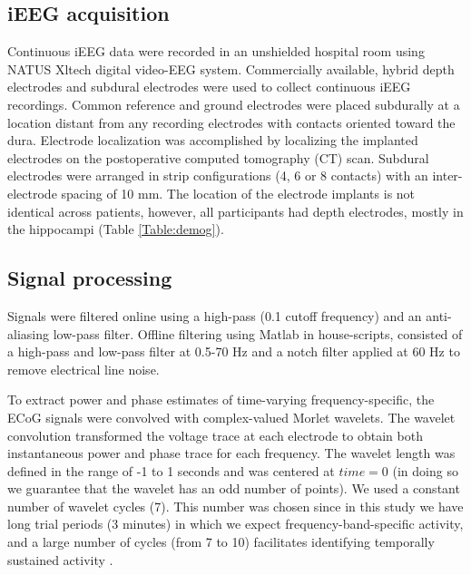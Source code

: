\documentclass[11pt, onecolumn]{article}
\begin{document}
\subsection{iEEG acquisition}
Continuous iEEG data were recorded in an unshielded hospital room using NATUS Xltech digital video-EEG system.
Commercially available, hybrid depth electrodes and subdural electrodes were used to collect continuous iEEG recordings. Common reference and ground electrodes were placed subdurally at a location distant from any recording electrodes with contacts oriented toward the dura.
Electrode localization was accomplished by localizing the implanted electrodes on the postoperative computed tomography (CT) scan.
Subdural electrodes were arranged in strip configurations (4, 6 or 8 contacts) with an inter-electrode spacing of 10 mm. The location of the electrode implants is not identical across patients, however, all participants had depth  electrodes,  mostly  in the hippocampi   (Table \ref{Table:demog}).

\subsection{Signal processing}
Signals were filtered online using a high-pass (0.1 cutoff frequency) and an anti-aliasing low-pass filter. %
Offline filtering using Matlab in house-scripts, consisted of a high-pass and low-pass filter at 0.5-70 Hz and a notch filter applied at 60 Hz to remove electrical line noise.

To extract power and phase estimates of time-varying frequency-specific, the ECoG signals were convolved with complex-valued Morlet wavelets. %
The  wavelet convolution transformed the voltage trace at each electrode to obtain both instantaneous power and phase trace for each frequency.
The wavelet length was defined in the range of -1 to 1 seconds and was centered at $time = 0$ (in doing so we guarantee that the wavelet has an odd number of points). 
We used a constant number of wavelet cycles (7). This number was chosen since in this study we have long trial  periods (3 minutes) in which we expect frequency-band-specific activity, and a large number  of cycles (from 7 to 10)  facilitates  identifying  temporally sustained  activity \citep{cohen2014analyzing}. 
\end{document}
